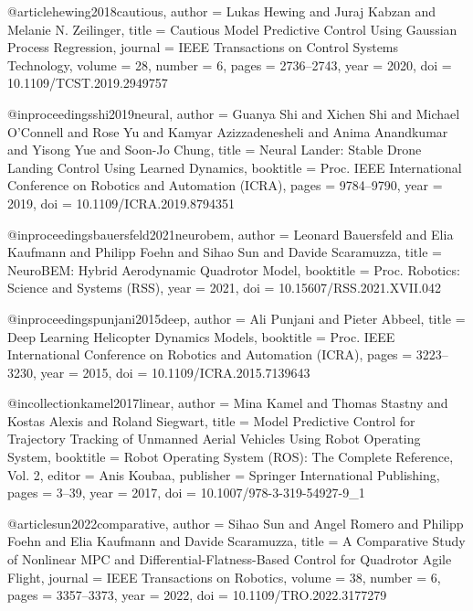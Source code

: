 \documentclass[conference]{IEEEtran}
\begin{document}
@article{hewing2018cautious,
  author    = {Lukas Hewing and Juraj Kabzan and Melanie N. Zeilinger},
  title     = {Cautious Model Predictive Control Using {Gaussian} Process Regression},
  journal   = {IEEE Transactions on Control Systems Technology},
  volume    = {28},
  number    = {6},
  pages     = {2736--2743},
  year      = {2020},
  doi       = {10.1109/TCST.2019.2949757}
}

@inproceedings{shi2019neural,
  author    = {Guanya Shi and Xichen Shi and Michael O'Connell and Rose Yu and Kamyar Azizzadenesheli and Anima Anandkumar and Yisong Yue and Soon-Jo Chung},
  title     = {Neural Lander: Stable Drone Landing Control Using Learned Dynamics},
  booktitle = {Proc. IEEE International Conference on Robotics and Automation (ICRA)},
  pages     = {9784--9790},
  year      = {2019},
  doi       = {10.1109/ICRA.2019.8794351}
}

@inproceedings{bauersfeld2021neurobem,
  author    = {Leonard Bauersfeld and Elia Kaufmann and Philipp Foehn and Sihao Sun and Davide Scaramuzza},
  title     = {{NeuroBEM}: Hybrid Aerodynamic Quadrotor Model},
  booktitle = {Proc. Robotics: Science and Systems (RSS)},
  year      = {2021},
  doi       = {10.15607/RSS.2021.XVII.042}
}

@inproceedings{punjani2015deep,
  author    = {Ali Punjani and Pieter Abbeel},
  title     = {Deep Learning Helicopter Dynamics Models},
  booktitle = {Proc. IEEE International Conference on Robotics and Automation (ICRA)},
  pages     = {3223--3230},
  year      = {2015},
  doi       = {10.1109/ICRA.2015.7139643}
}

@incollection{kamel2017linear,
  author    = {Mina Kamel and Thomas Stastny and Kostas Alexis and Roland Siegwart},
  title     = {Model Predictive Control for Trajectory Tracking of Unmanned Aerial Vehicles Using Robot Operating System},
  booktitle = {Robot Operating System ({ROS}): The Complete Reference, Vol. 2},
  editor    = {Anis Koubaa},
  publisher = {Springer International Publishing},
  pages     = {3--39},
  year      = {2017},
  doi       = {10.1007/978-3-319-54927-9_1}
}

@article{sun2022comparative,
  author    = {Sihao Sun and Angel Romero and Philipp Foehn and Elia Kaufmann and Davide Scaramuzza},
  title     = {A Comparative Study of Nonlinear {MPC} and Differential-Flatness-Based Control for Quadrotor Agile Flight},
  journal   = {IEEE Transactions on Robotics},
  volume    = {38},
  number    = {6},
  pages     = {3357--3373},
  year      = {2022},
  doi       = {10.1109/TRO.2022.3177279}
}
\end{document}
